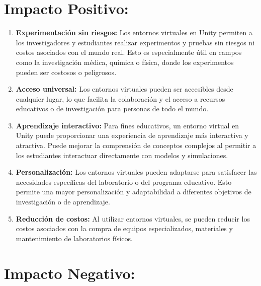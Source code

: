 \section{Impacto Positivo:}

\begin{enumerate}
    \item \textbf{Experimentación sin riesgos:} Los entornos virtuales en Unity permiten a los investigadores y estudiantes realizar experimentos y pruebas sin riesgos ni costos asociados con el mundo real. Esto es especialmente útil en campos como la investigación médica, química o física, donde los experimentos pueden ser costosos o peligrosos.
    
    \item \textbf{Acceso universal:} Los entornos virtuales pueden ser accesibles desde cualquier lugar, lo que facilita la colaboración y el acceso a recursos educativos o de investigación para personas de todo el mundo.
    
    \item \textbf{Aprendizaje interactivo:} Para fines educativos, un entorno virtual en Unity puede proporcionar una experiencia de aprendizaje más interactiva y atractiva. Puede mejorar la comprensión de conceptos complejos al permitir a los estudiantes interactuar directamente con modelos y simulaciones.
    
    \item \textbf{Personalización:} Los entornos virtuales pueden adaptarse para satisfacer las necesidades específicas del laboratorio o del programa educativo. Esto permite una mayor personalización y adaptabilidad a diferentes objetivos de investigación o de aprendizaje.
    
    \item \textbf{Reducción de costos:} Al utilizar entornos virtuales, se pueden reducir los costos asociados con la compra de equipos especializados, materiales y mantenimiento de laboratorios físicos.
\end{enumerate}

\section{Impacto Negativo:}


